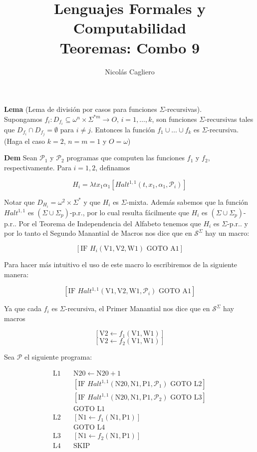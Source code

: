\documentclass{article}
\title{Lenguajes Formales y Computabilidad \\
        \large Teoremas: Combo 9 }
\author{Nicolás Cagliero}
\begin{document}
\maketitle

\textbf{Lema} (Lema de división por casos para funciones $\Sigma$-recursivas). \\Supongamos $f_i : D_{f_i} \subseteq \omega^n \times \Sigma^{*m} \to O$, $i = 1, \ldots, k$, son funciones $\Sigma$-recursivas tales que $D_{f_i} \cap D_{f_j} = \emptyset$ para $i \neq j$. Entonces la función $f_1 \cup \ldots \cup f_k$ es $\Sigma$-recursiva.
    (Haga el caso $k = 2$, $n = m = 1$ y $O = \omega$)

\bigskip
\textbf{Dem} 
Sean $\mathcal{P}_1$ y $\mathcal{P}_2$ programas que computen las funciones $f_1$ y $f_2$, respectivamente. Para $i = 1,2$, definamos

\[
H_i = \lambda tx_1\alpha_1 \left[ Halt^{1,1}(t, x_1, \alpha_1, \mathcal{P}_i) \right]
\]

Notar que $D_{H_i} = \omega^2 \times \Sigma^*$ y que $H_i$ es $\Sigma$-mixta. Además sabemos que la función  
$Halt^{1,1}$ es $(\Sigma \cup \Sigma_p)$-p.r., por lo cual resulta fácilmente que $H_i$ es $(\Sigma \cup \Sigma_p)$-p.r..  
Por el Teorema de Independencia del Alfabeto tenemos que $H_i$ es $\Sigma$-p.r.. y por lo tanto  
el Segundo Manantial de Macros nos dice que en $\mathcal{S}^{\Sigma}$ hay un macro:

\[
[ \text{IF } H_i(\text{V1}, \text{V2}, \text{W1}) \text{ GOTO A1} ]
\]

Para hacer más intuitivo el uso de este macro lo escribiremos de la siguiente manera:

\[
[ \text{IF } Halt^{1,1}(\text{V1}, \text{V2}, \text{W1}, \mathcal{P}_i) \text{ GOTO A1} ]
\]

Ya que cada $f_i$ es $\Sigma$-recursiva, el Primer Manantial nos dice que en $\mathcal{S}^{\Sigma}$ hay macros

\[
[ \text{V2} \leftarrow f_1(\text{V1}, \text{W1}) ]
\]
\[
[ \text{V2} \leftarrow f_2(\text{V1}, \text{W1}) ]
\]

Sea $\mathcal{P}$ el siguiente programa:

\begin{align*}
\text{L1} \quad & \text{N20} \leftarrow \text{N20} + 1 \\
                & [\text{IF } Halt^{1,1}(\text{N20}, \text{N1}, \text{P1}, \mathcal{P}_1) \text{ GOTO L2}] \\
                & [\text{IF } Halt^{1,1}(\text{N20}, \text{N1}, \text{P1}, \mathcal{P}_2) \text{ GOTO L3}] \\
                & \text{GOTO L1} \\
\text{L2} \quad & [\text{N1} \leftarrow f_1(\text{N1}, \text{P1})] \\
                & \text{GOTO L4} \\
\text{L3} \quad & [\text{N1} \leftarrow f_2(\text{N1}, \text{P1})] \\
\text{L4} \quad & \text{SKIP}
\end{align*}
\end{document}
